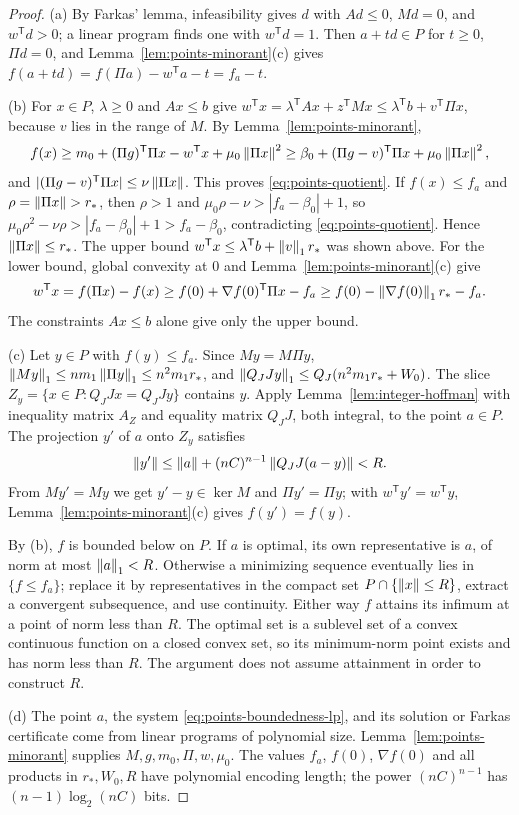 \begin{proof}
(a) By Farkas' lemma, infeasibility gives $d$ with $Ad\le0$, $Md=0$, and
$w^{\mathsf T}d>0$; a linear program finds one with $w^{\mathsf T}d=1$. Then
$a+td\in P$ for $t\ge0$, $\Pi d=0$, and Lemma~\ref{lem:points-minorant}(c)
gives $f(a+td)=f(\Pi a)-w^{\mathsf T}a-t=f_a-t$.

(b) For $x\in P$, $\lambda\ge0$ and $Ax\le b$ give
$w^{\mathsf T}x=\lambda^{\mathsf T}Ax+z^{\mathsf T}Mx\le
\lambda^{\mathsf T}b+v^{\mathsf T}\Pi x$, because $v$ lies in the range of
$M$. By Lemma~\ref{lem:points-minorant},
\[
 f(x)\ge m_0+(\Pi g)^{\mathsf T}\Pi x-w^{\mathsf T}x+\mu_0\left\lVert\Pi x\right\rVert^2
 \ge\beta_0+(\Pi g-v)^{\mathsf T}\Pi x+\mu_0\left\lVert\Pi x\right\rVert^2 ,
\]
and $|(\Pi g-v)^{\mathsf T}\Pi x|\le\nu\left\lVert\Pi x\right\rVert$. This proves
\eqref{eq:points-quotient}. If $f(x)\le f_a$ and $\rho=\left\lVert\Pi x\right\rVert>r_*$,
then $\rho>1$ and $\mu_0\rho-\nu>|f_a-\beta_0|+1$, so
$\mu_0\rho^2-\nu\rho>|f_a-\beta_0|+1>f_a-\beta_0$, contradicting
\eqref{eq:points-quotient}. Hence $\left\lVert\Pi x\right\rVert\le r_*$. The upper bound
$w^{\mathsf T}x\le\lambda^{\mathsf T}b+\left\lVert v\right\rVert_1r_*$ was shown above. For
the lower bound, global convexity at $0$ and
Lemma~\ref{lem:points-minorant}(c) give
\[
 w^{\mathsf T}x=f(\Pi x)-f(x)\ge f(0)+\nabla f(0)^{\mathsf T}\Pi x-f_a
 \ge f(0)-\left\lVert\nabla f(0)\right\rVert_1r_*-f_a .
\]
The constraints $Ax\le b$ alone give only the upper bound.

(c) Let $y\in P$ with $f(y)\le f_a$. Since $My=M\Pi y$,
$\left\lVert My\right\rVert_1\le nm_1\left\lVert\Pi y\right\rVert_1\le n^2m_1r_*$, and
$\left\lVert Q_JJy\right\rVert_1\le Q_J(n^2m_1r_*+W_0)$. The slice
$Z_y=\{x\in P:Q_JJx=Q_JJy\}$ contains $y$. Apply
Lemma~\ref{lem:integer-hoffman} with inequality matrix $A_Z$ and equality
matrix $Q_JJ$, both integral, to the point $a\in P$. The projection $y'$ of
$a$ onto $Z_y$ satisfies
\[
 \left\lVert y'\right\rVert\le\left\lVert a\right\rVert+(nC)^{n-1}\left\lVert Q_JJ(a-y)\right\rVert<R .
\]
From $My'=My$ we get $y'-y\in\ker M$ and $\Pi y'=\Pi y$; with
$w^{\mathsf T}y'=w^{\mathsf T}y$, Lemma~\ref{lem:points-minorant}(c) gives
$f(y')=f(y)$.

By (b), $f$ is bounded below on $P$. If $a$ is optimal, its own
representative is $a$, of norm at most $\left\lVert a\right\rVert_1<R$. Otherwise a minimizing
sequence eventually lies in $\{f\le f_a\}$; replace it by representatives
in the compact set $P\cap\{\left\lVert x\right\rVert\le R\}$, extract a convergent
subsequence, and use continuity. Either way $f$ attains its infimum at a
point of norm less than $R$. The optimal set is a sublevel set of a convex
continuous function on a closed convex set, so its minimum-norm point exists
and has norm less than $R$. The argument does not assume attainment in
order to construct $R$.

(d) The point $a$, the system \eqref{eq:points-boundedness-lp}, and its
solution or Farkas certificate come from linear programs of polynomial size.
Lemma~\ref{lem:points-minorant} supplies $M,g,m_0,\Pi,w,\mu_0$. The values
$f_a$, $f(0)$, $\nabla f(0)$ and all products in $r_*,W_0,R$ have
polynomial encoding length; the power $(nC)^{n-1}$ has
$(n-1)\log_2(nC)$ bits.
\end{proof}

